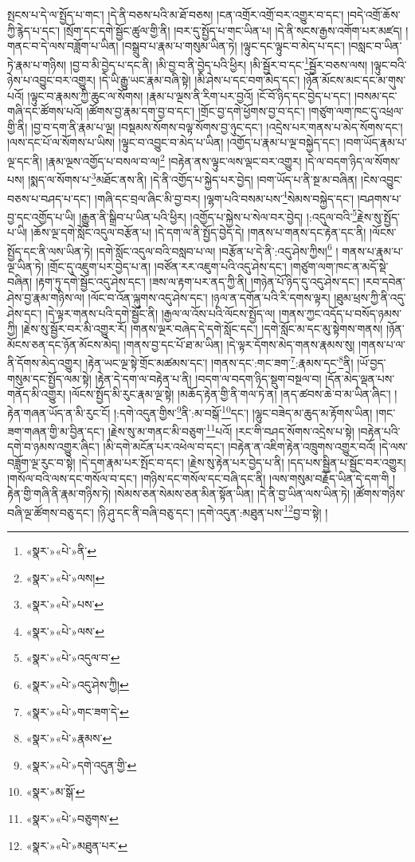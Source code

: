 སྤངས་པ་དེ་ལ་སྤྱོད་པ་གང་། །དེ་ནི་བཅས་པའི་མ་ཐོ་བཅས། །ངན་འགྲོར་འགྲོ་བར་འགྱུར་བ་དང་། །བདེ་འགྲོ་ཆོས་ཀྱི་རྙེད་པ་དང་། །སྲོག་དང་དགེ་སྦྱོང་ཚུལ་གྱི་ནི། །བར་དུ་སྤྱོད་པ་གང་ཡིན་པ། །དེ་ནི་སངས་རྒྱས་འགོག་པར་མཛད། །གནང་བ་དེ་ལས་བཟློག་པ་ཡིན། །བསྒྲུབ་པ་རྣམ་པ་གསུམ་ཡིན་ཏེ། །ལྟུང་དང་ལྟུང་བ་མེད་པ་དང་། །བསླང་བ་ཡིན་ཏེ་རྣམ་པ་གཉིས། །བྱ་བ་མི་བྱེད་པ་དང་ནི། །མི་བྱ་བ་ནི་བྱེད་པའི་ཕྱིར། །མི་སྦྱོར་བ་དང་\footnote{«སྣར་»«པེ་»ནི་}སྦྱོར་བཅས་ལས། །ལྟུང་བའི་ཉེས་པ་འབྱུང་བར་འགྱུར། །དེ་ཡི་རྒྱུ་ཡང་རྣམ་བཞི་སྟེ། །མི་ཤེས་པ་དང་བག་མེད་དང་། །ཉོན་མོངས་མང་དང་མ་གུས་པའོ། །ལྟུང་བ་རྣམས་ཀྱི་ཆུང་ལ་སོགས། །རྣམ་པ་ལྔས་ནི་རིག་པར་བྱའོ། །ངོ་བོ་ཉིད་དང་བྱེད་པ་དང་། །བསམ་དང་གཞི་དང་ཚོགས་པའོ། །ཚོགས་བྱ་རྣམ་དག་བྱ་བ་དང་། །གྲོང་བྱ་དགེ་ཕྱོགས་བྱ་བ་དང་། །གཙུག་ལག་ཁང་དུ་འཕྲལ་གྱི་ནི། །བྱ་བ་དག་ནི་རྣམ་པ་ལྔ། །བསྡམས་སོགས་བལྟ་སོགས་བྱ་ཉུང་དང་། །འདྲེས་པར་གནས་པ་མེད་སོགས་དང་། །ལས་དང་པོ་ལ་སོགས་པ་ཡིས། །ལྟུང་བ་འབྱུང་བ་མེད་པ་ཡིན། །འགྱོད་པ་རྣམ་པ་ལྔ་བསྐྱེད་དང་། །བག་ཡོད་རྣམ་པ་ལྔ་དང་ནི། །རྣམ་ལྔས་འགྱོད་པ་བསལ་བ་ལ།\footnote{«སྣར་»«པེ་»ལས།} །བརྟེན་ནས་ལྟུང་ལས་ལྡང་བར་འགྱུར། །དེ་ལ་བདག་ཉིད་ལ་སོགས་པས། །སྨད་ལ་སོགས་པ་\footnote{«སྣར་»«པེ་»པས་}མཐོང་ནས་ནི། །དེ་ནི་འགྱོད་པ་སྐྱེད་པར་བྱེད། །བག་ཡོད་པ་ནི་སྔ་མ་བཞིན། །ངེས་འབྱུང་བཅས་པ་བཤད་པ་དང་། །གཞི་དང་བྲལ་ཞིང་མི་བྱ་བར། །ལྷག་པའི་བསམ་པས་\footnote{«སྣར་»«པེ་»ལས་}སེམས་བསྐྱེད་དང་། །བཤགས་པ་བྱ་དང་འགྱོད་པ་ཡི། །རྒྱུན་ནི་སྒྲིབ་པ་ཡིན་པའི་ཕྱིར། །འགྱོད་པ་སྐྱེས་པ་སེལ་བར་བྱེད། །:འདུལ་བའི་\footnote{«སྣར་»«པེ་»འདུལ་བ་}རྗེས་སུ་སྤྱོད་པ་ཡི། །ཆོས་ལྔ་དགེ་སློང་འདུལ་བརྩོན་པ། །དེ་དག་ལ་ནི་སྤྱོད་བྱེད་དེ། །གནས་པ་གནས་དང་རྟེན་དང་ནི། །ལོངས་སྤྱོད་དང་ནི་ལས་ཡིན་ཏེ། །དགེ་སློང་འདུལ་བའི་བསླབ་པ་ལ། །བརྩོན་པ་དེ་ནི་:འདུ་ཤེས་ཀྱིས།\footnote{«སྣར་»«པེ་»འདུ་ཤེས་ཀྱི།} །
གནས་པ་རྣམ་པ་ལྔ་ཡིན་ཏེ། །གྲོང་དུ་འཇུག་པར་བྱེད་པ་ན། །བཙོན་རར་འཇུག་པའི་འདུ་ཤེས་དང་། །གཙུག་ལག་ཁང་ན་མདོ་སྡེ་བཞིན། །རྟག་ཏུ་དགེ་སྦྱོང་འདུ་ཤེས་དང་། །ཟས་ལ་རྟག་པར་ནད་ཀྱི་ནི། །གཉེན་པོ་ཉིད་དུ་འདུ་ཤེས་དང་། །རབ་དབེན་ཤེས་བྱ་རྣམ་གཉིས་ལ། །ལོང་བ་འོན་ལྐུགས་འདུ་ཤེས་དང་། །ཉལ་ན་དགོན་པའི་རི་དགས་ལྟར། །ཐུམ་ཕྲས་ཀྱི་ནི་འདུ་ཤེས་དང་། །དེ་ལྟར་གནས་པའི་དགེ་སྦྱོང་ནི། །རྒྱལ་ལ་འོས་པའི་ལོངས་སྤྱོད་ལ། །གནས་ཀྱང་འདོད་པ་བསོད་ཉམས་ཀྱི། །རྗེས་སུ་སྦྱོར་བར་མི་འགྱུར་རོ། །གནས་ལྔར་བཞེད་དེ་དགེ་སློང་དང་། །དགེ་སློང་མ་དང་མུ་སྟེགས་གནས། །ཉོན་མོངས་ཅན་དང་ཉོན་མོངས་མེད། །གནས་བྱ་དང་པོ་ཐ་མ་ཡིན། །དེ་ལྟར་དོགས་མེད་གནས་རྣམས་སུ། །གནས་པ་ལ་ནི་དོགས་མེད་འགྱུར། །རྟེན་ཡང་ལྔ་སྟེ་གྲོང་མཚམས་དང་། །གནས་དང་:གང་ཟག་\footnote{«སྣར་»«པེ་»གང་ཟག་དེ་}:རྣམས་དང་\footnote{«སྣར་»«པེ་»རྣམས་}ནི། །ཡོ་བྱད་གསུམ་དང་སྤྱོད་ལམ་སྟེ། །རྟེན་དེ་དག་ལ་བརྟེན་པ་ནི། །བདག་ལ་བདག་ཉིད་སྡུག་བསྔལ་བ། །དོན་མེད་ལྡན་པས་གནོད་མི་འགྱུར། །ལོངས་སྤྱོད་མི་རུང་རྣམ་ལྔ་སྟེ། །མཆོད་རྟེན་གྱི་ནི་གལ་ཏེ་ན། །ནད་ཚབས་ཆེ་བ་མ་ཡིན་ཞིང་། །རྟེན་གཞན་ཡོད་ན་མི་རུང་ངོ། །:དགེ་འདུན་གྱིས་\footnote{«སྣར་»«པེ་»དགེ་འདུན་གྱི་}ནི་:མ་བསྒོ་\footnote{«སྣར་»མ་སྒོ་}དང་། །ལྷུང་བཟེད་མ་ཆུད་མ་རྟོགས་ཡིན། །གང་ཟག་གཞན་གྱི་མ་བྱིན་དང་། །རྗེས་སུ་མ་གནང་མི་བཅུག་\footnote{«སྣར་»«པེ་»བཅུགས་}པའོ། །རང་གི་བཤད་སོགས་འདྲེས་པ་སྟེ། །བརྟེན་པའི་དགེ་བ་ཉམས་འགྱུར་ཞིང་། །མི་དགེ་མངོན་པར་འཕེལ་བ་དང་། །བརྟེན་ན་འཇིག་རྟེན་འཁྲུགས་འགྱུར་བའོ། །དེ་ལས་བཟློག་ལྔ་རུང་བ་སྟེ། །དེ་དག་རྣམ་པར་སྤོང་བ་དང་། །རྗེས་སུ་རྟེན་པར་བྱེད་པ་ནི། །དད་པས་སྦྱིན་པ་སྦྱོང་བར་འགྱུར། །གསོལ་བའི་ལས་དང་གསོལ་བ་དང་། །གཉིས་དང་གསོལ་དང་བཞི་དང་ནི། །ལས་གསུམ་བརྗོད་ཡིན་དེ་དག་གི །རྟེན་གྱི་གཞི་ནི་རྣམ་གཉིས་ཏེ། །སེམས་ཅན་སེམས་ཅན་མིན་སྟོན་ཡིན། །དེ་ནི་བྱ་ཡིན་ལས་ཡིན་ཏེ། །ཚོགས་གཉིས་བཞི་ལྔ་ཚོགས་བཅུ་དང་། །ཉི་ཤུ་དང་ནི་བཞི་བཅུ་དང་། །དགེ་འདུན་:མཐུན་པས་\footnote{«སྣར་»«པེ་»མཐུན་པར་}བྱ་བ་སྟེ། །

